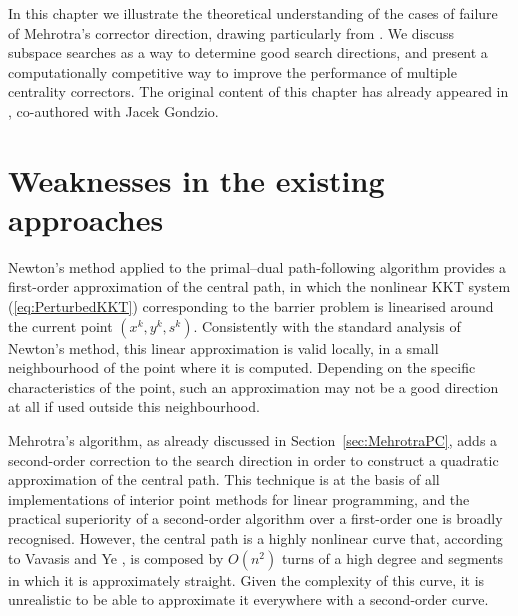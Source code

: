 
%
%
\label{ch:Correctors}

In this chapter we illustrate the theoretical understanding of 
the cases of failure of Mehrotra's corrector direction,
drawing particularly from \cite{Cartis04,Cartis05}.
We discuss subspace searches as a way to determine good
search directions, and present a computationally competitive way
to improve the performance of multiple centrality correctors.
The original content of this chapter has already appeared 
in \cite{ColomboGondzio05}, co-authored with Jacek Gondzio.


%
%
\section{Weaknesses in the existing approaches}

Newton's method applied to the primal--dual path-following algorithm 
provides a first-order approximation of the central path, in which
the nonlinear KKT system (\ref{eq:PerturbedKKT}) corresponding 
to the barrier problem 
is linearised around the current point $(x^k,y^k,s^k)$. Consistently with 
the standard analysis of Newton's method, this linear approximation 
is valid locally, in a small neighbourhood of the point where 
it is computed. Depending on the specific characteristics of the point, 
such an approximation may not be a good direction at all 
if used outside this neighbourhood.

Mehrotra's algorithm, as already discussed in 
Section~\ref{sec:MehrotraPC}, adds a second-order correction to the search 
direction in order to construct a quadratic approximation 
of the central path. This technique is at the basis of all
implementations of interior point methods for linear programming,
and the practical superiority of a second-order algorithm over 
a first-order one is broadly recognised.
However, the central path is a highly nonlinear curve that, according 
to Vavasis and Ye \cite{VavasisYe}, is composed by $O(n^2)$ turns 
of a high degree and segments in which it is approximately straight. 
Given the complexity of this curve, it is unrealistic to be able 
to approximate it everywhere with a second-order curve.



